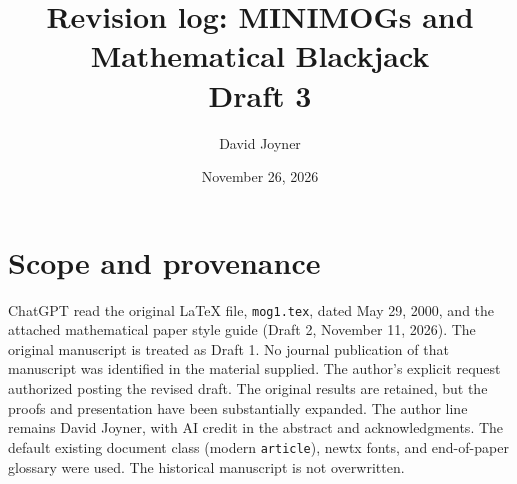 \documentclass[12pt,letterpaper]{article}
\title{Revision log: MINIMOGs and Mathematical Blackjack\\\large Draft 3}
\author{David Joyner}
\date{November 26, 2026}
\begin{document}
\maketitle
\section{Scope and provenance}
ChatGPT read the original LaTeX file, \texttt{mog1.tex}, dated May 29, 2000, and the attached mathematical paper style guide (Draft 2, November 11, 2026). The original manuscript is treated as Draft 1. No journal publication of that manuscript was identified in the material supplied. The author's explicit request authorized posting the revised draft. The original results are retained, but the proofs and presentation have been substantially expanded. The author line remains David Joyner, with AI credit in the abstract and acknowledgments. The default existing document class (modern \texttt{article}), newtx fonts, and end-of-paper glossary were used. The historical manuscript is not overwritten.
\end{document}
